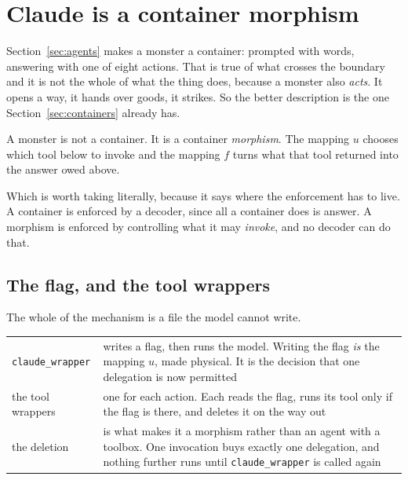 \documentclass[11pt,a4paper]{article}
\begin{document}
\section{Claude is a container morphism}
\label{sec:unix}

Section~\ref{sec:agents} makes a monster a container: prompted with words, answering with one of
eight actions. That is true of what crosses the boundary and it is not the whole of what the thing
does, because a monster also \emph{acts}. It opens a way, it hands over goods, it strikes. So the
better description is the one Section~\ref{sec:containers} already has.

\begin{sectionbox}
A monster is not a container. It is a container \emph{morphism}. The mapping $u$ chooses which tool
below to invoke and the mapping $f$ turns what that tool returned into the answer owed above.
\end{sectionbox}

Which is worth taking literally, because it says where the enforcement has to live. A container is
enforced by a decoder, since all a container does is answer. A morphism is enforced by controlling
what it may \emph{invoke}, and no decoder can do that.

\subsection{The flag, and the tool wrappers}

The whole of the mechanism is a file the model cannot write.

\begin{center}
\begin{tabular}{@{}l@{\hspace{4mm}}>{\raggedright\arraybackslash}p{}@{}}
\toprule
\texttt{claude\_wrapper} & writes a flag, then runs the model. Writing the flag \emph{is} the
mapping $u$, made physical. It is the decision that one delegation is now permitted \\[1mm]
the tool wrappers & one for each action. Each reads the flag, runs its tool only if the flag is
there, and deletes it on the way out \\[1mm]
the deletion & is what makes it a morphism rather than an agent with a toolbox. One invocation
buys exactly one delegation, and nothing further runs until \texttt{claude\_wrapper} is called
again \\
\bottomrule
\end{tabular}
\end{center}
\end{document}
